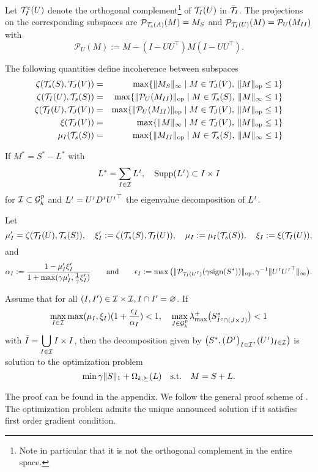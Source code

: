 Let $\mathcal{T}^c_I(U)$ denote the orthogonal complement\footnote{Note in particular that it is not the orthogonal complement in the entire space.} of $\mathcal{T}_I(U)$ in $\bar{\mathcal{T}}_I$. The projections on the corresponding subspaces are $\mathcal{P}_{\mathcal{T}_s(A)}(M)=M_S$ and $\mathcal{P}_{\mathcal{T}_I(U)}(M)=\mathcal{P}_{U}(M_{II})$ with $$\mathcal{P}_U(M):=M-(I-UU^\top)M(I-UU^\top).$$ 

The following quantities define incoherence between subspaces
\begin{eqnarray*}
\zeta(\mathcal{T}_s(S),\mathcal{T}_J(V))&=&\max \{ {\|M_S\|_\infty} \mid M \in \mathcal{T}_J(V), \: \|M\|_{{\rm op}}\leq 1\}\\
\zeta(\mathcal{T}_I(U),\mathcal{T}_s(S))&=&\max \{ {\|\mathcal{P}_{U}(M_{II})\|_{{\rm op}}} \mid M \in \mathcal{T}_s(S), \: \|M\|_{\infty}\leq 1\}\\
\zeta(\mathcal{T}_I(U),\mathcal{T}_J(V))&=&\max \{ {\|\mathcal{P}_{U}(M_{II})\|_{{\rm op}}} \mid  M \in \mathcal{T}_J(V), \: \|M\|_{{\rm op}}\leq 1\}\\
\xi(\mathcal{T}_J(V))&=&\max \{ {\|M\|_\infty} \mid M \in \mathcal{T}_J(V), \: \|M\|_{{\rm op}}\leq 1\}\\
\mu_I(\mathcal{T}_s(S))&=&\max \{ {\|M_{II}\|_{\rm op}} \mid M \in \mathcal{T}_s(S), \: \|M\|_{\infty}\leq 1\}\\
\end{eqnarray*}

\begin{thm}
\label{theo:two}
If $M^*=S^*-L^*$ with $$L^*=\sum_{I \in \mathcal{I}} L^{{\scriptscriptstyle I}},  \quad {\rm Supp}(L^{{\scriptscriptstyle I}}) \subset I \times I$$ for $\mathcal{I} \subset \mathcal{G}^p_k$ %
and $L^{{\scriptscriptstyle I}}=U^{{\scriptscriptstyle I}} D^{{\scriptscriptstyle I}} {U^{{\scriptscriptstyle I}}}^\top$ the eigenvalue decomposition of $L^{{\scriptscriptstyle I}}$.

Let $$\mu'_I=\zeta(\mathcal{T}_I(U),\mathcal{T}_s(S)), \quad  \xi'_I :=\zeta(\mathcal{T}_s(S),\mathcal{T}_I(U)), \quad \mu_I:=\mu_I(\mathcal{T}_s(S)) , \quad \xi_I:=\xi(\mathcal{T}_I(U)),$$
and 
$$\alpha_I:=\frac{1-\mu'_I\xi'_I}{1+\max(\gamma \mu'_I,\frac{1}{\gamma} \xi'_I)} \qquad \text{and} \qquad \epsilon_I :=\max \big (\|\mathcal{P}_{\mathcal{T}_I(U^{{\scriptscriptstyle I}})}(\gamma \text{sign}(S^*))\|_{{\rm op}}, \gamma^{-1}\|U^{{\scriptscriptstyle I}} {U^{{\scriptscriptstyle I}}}^\top\|_{\infty} \big ).$$

Assume that for all $(I,I') \in \mathcal{I} \times \mathcal{I}, I \cap I'=\varnothing$. If $$\displaystyle\max_{I \in \mathcal{I}} \max(\mu_I,\xi_I) (1+\frac{\epsilon_I}{\alpha_I})<1, \quad \displaystyle \max_{J \in \mathcal{G}^p_k} \lambda_{\max}^+\big (S^*_{\bar{I}^c \cap (J \times J)} \big ) <1$$ %
with $\displaystyle \bar{I}=\bigcup_{I \in \mathcal{I}} I \times I$,
then the  decomposition given by $\big (S^*,(D^{{\scriptscriptstyle I}} \big)_{I \in \mathcal{I}},(U^{{\scriptscriptstyle I}})_{I \in \mathcal{I}} \big )$ is solution to the optimization problem $$\displaystyle \min \gamma \|S\|_1+\Omega_{k,\succeq}(L) \quad \text{\text{s.t.}} \quad M=S+L.$$
\end{thm}

The proof can be found in the appendix. We follow the general proof scheme of \citet{chandrasekaran2011rank}. The optimization problem admits the unique announced solution if it satisfies first order gradient condition.
